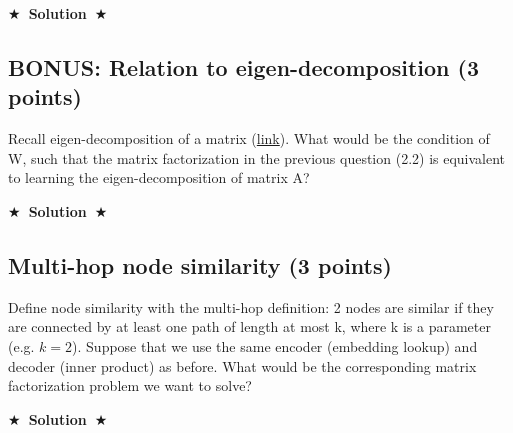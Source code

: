 \documentclass{article}
\numberwithin{figure}{section}
\newcommand{\Solution}[1]{{\medskip \color{red} \bf $\bigstar$~\sf \textbf{Solution}~$\bigstar$ \sf #1 } \bigskip}
\begin{document}
\Solution{}



\subsection{BONUS: Relation to eigen-decomposition (3 points)}
Recall eigen-decomposition of a matrix (\href{https://en.wikipedia.org/wiki/Eigendecomposition_of_a_matrix}{link}). What would be the condition of W, such that the matrix factorization in the previous question (2.2) is equivalent to learning the eigen-decomposition of matrix A?

\Solution{}

\subsection{Multi-hop node similarity (3 points)}
Define node similarity with the multi-hop definition: 2 nodes are similar if they are connected by at least one path of length at most k, where k is a parameter (e.g. $k = 2$). Suppose that we use the same encoder (embedding lookup) and decoder (inner product) as before. What would be the corresponding matrix factorization problem we want to solve?

\Solution{}
\end{document}

